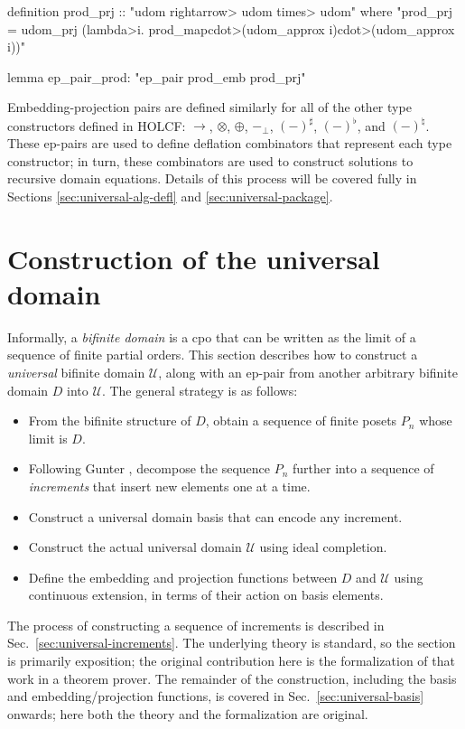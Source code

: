 \unmedskip
{}
\begin{isacode}
definition prod_prj :: "udom \<rightarrow> udom \<times> udom"
  where "prod_prj = udom_prj (\<lambda>i. prod_map\<cdot>(udom_approx i)\<cdot>(udom_approx i))"
\end{isacode}
\unmedskip
\begin{isacode}
lemma ep_pair_prod: "ep_pair prod_emb prod_prj"
\end{isacode}
%
Embedding-projection pairs are defined similarly for all of the other type constructors defined in HOLCF: $\to$, $\otimes$, $\oplus$, $-_\bot$, $(-)^\sharp$, $(-)^\flat$, and $(-)^\natural$. These ep-pairs are used to define deflation combinators that represent each type constructor; in turn, these combinators are used to construct solutions to recursive domain equations. Details of this process will be covered fully in Sections \ref{sec:universal-alg-defl} and \ref{sec:universal-package}.

\section{Construction of the universal domain}
\label{sec:universal-construction}

Informally, a \emph{bifinite domain} is a cpo that can be written as the limit of a sequence of finite partial orders. This section describes how to construct a \emph{universal} bifinite domain $\mathcal{U}$, along with an ep-pair from another arbitrary bifinite domain $D$ into $\mathcal{U}$. The general strategy is as follows:
\begin{itemize}
\item From the bifinite structure of $D$, obtain a sequence of finite posets $P_n$ whose limit is $D$.
\item Following Gunter \cite{gunter87universal}, decompose the sequence $P_n$ further into a sequence of \emph{increments} that insert new elements one at a time.
\item Construct a universal domain basis that can encode any increment.
\item Construct the actual universal domain $\mathcal{U}$ using ideal completion.
\item Define the embedding and projection functions between $D$ and $\mathcal{U}$ using continuous extension, in terms of their action on basis elements.
\end{itemize}

The process of constructing a sequence of increments is described in Sec.~\ref{sec:universal-increments}. The underlying theory is standard, so the section is primarily exposition; the original contribution here is the formalization of that work in a theorem prover. The remainder of the construction, including the basis and embedding/projection functions, is covered in Sec.~\ref{sec:universal-basis} onwards; here both the theory and the formalization are original.

